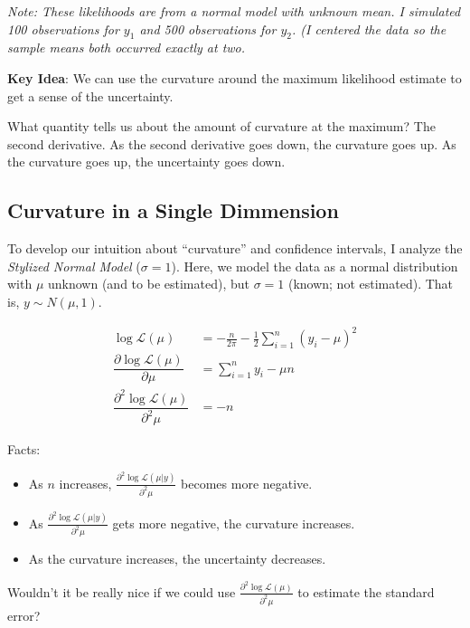 \documentclass[
]{book}
\providecommand{\tightlist}{%
  \setlength{\itemsep}{0pt}\setlength{\parskip}{0pt}}
\begin{document}
\emph{Note: These likelihoods are from a normal model with unknown mean.
I simulated 100 observations for \(y_1\) and 500 observations for
\(y_2\). (I centered the data so the sample means both occurred exactly
at two.}

\textbf{Key Idea}: We can use the curvature around the maximum
likelihood estimate to get a sense of the uncertainty.

What quantity tells us about the amount of curvature at the maximum? The
second derivative. As the second derivative goes down, the curvature
goes up. As the curvature goes up, the uncertainty goes down.

\hypertarget{curvature-in-a-single-dimmension}{%
\subsection{Curvature in a Single
Dimmension}\label{curvature-in-a-single-dimmension}}

To develop our intuition about ``curvature'' and confidence intervals, I
analyze the \emph{Stylized Normal Model} (\(\sigma = 1\)). Here, we
model the data as a normal distribution with \(\mu\) unknown (and to be
estimated), but \(\sigma = 1\) (known; not estimated). That is,
\(y \sim N(\mu, 1)\).

\[
\begin{aligned}
\log \mathcal{L}(\mu) &= -\frac{n}{2\pi} - \frac{1}{2}\sum_{i = 1}^n (y_i - \mu)^2\\
\dfrac{\partial \log \mathcal{L}(\mu)}{\partial \mu} &= \sum_{i = 1}^n y_i - \mu n\\
\dfrac{\partial^2 \log \mathcal{L}(\mu)}{\partial^2 \mu} &=  - n
\end{aligned}
\]

Facts:

\begin{itemize}
\tightlist
\item
  As \(n\) increases,
  \(\frac{\partial^2 \log \mathcal{L}(\mu | y)}{\partial^2 \mu}\)
  becomes more negative.
\item
  As \(\frac{\partial^2 \log \mathcal{L}(\mu | y)}{\partial^2 \mu}\)
  gets more negative, the curvature increases.
\item
  As the curvature increases, the uncertainty decreases.
\end{itemize}

Wouldn't it be really nice if we could use
\(\frac{\partial^2 \log \mathcal{L}(\mu)}{\partial^2 \mu}\) to estimate
the standard error?
\end{document}
